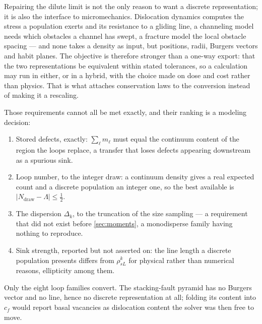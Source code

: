 Repairing the dilute limit is not the only reason to want a discrete
representation; it is also the interface to micromechanics. Dislocation dynamics
computes the stress a population exerts and its resistance to a gliding line, a
channeling model needs which obstacles a channel has swept, a fracture model the
local obstacle spacing --- and none takes a density as input, but positions,
radii, Burgers vectors and habit planes. The objective is therefore stronger
than a one-way export: that the two representations be equivalent within stated
tolerances, so a calculation may run in either, or in a hybrid, with the choice
made on dose and cost rather than physics. That is what attaches conservation
laws to the conversion instead of making it a rescaling.

Those requirements cannot all be met exactly, and their ranking is a modeling
decision:

\begin{enumerate}[itemsep=2pt]
\item Stored defects, exactly: $\sum_\ell m_\ell$ must equal the continuum
      content of the region the loops replace, a transfer that loses defects
      appearing downstream as a spurious sink.
\item Loop number, to the integer draw: a continuum density gives a real
      expected count and a discrete population an integer one, so the best
      available is $|N_{\mathrm{draw}}-\Lambda|\le\tfrac12$.
\item The dispersion $\Delta_k$, to the truncation of the size sampling --- a
      requirement that did not exist before \cref{sec:moments}, a monodisperse
      family having nothing to reproduce.
\item Sink strength, reported but not asserted on: the line length a discrete
      population presents differs from $\rho^k_{sL}$ for physical rather than
      numerical reasons, ellipticity among them.
\end{enumerate}

Only the eight loop families convert. The stacking-fault pyramid has no Burgers
vector and no line, hence no discrete representation at all; folding its content
into $c_f$ would report basal vacancies as dislocation content the solver was
then free to move.

